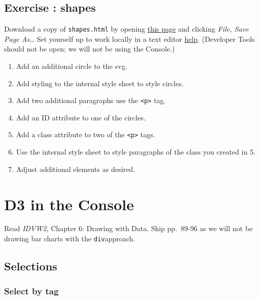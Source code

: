 \documentclass[openany]{book}
\begin{document}
\hypertarget{exercise-shapes}{%
\section{Exercise : shapes}\label{exercise-shapes}}

Download a copy of \texttt{shapes.html} by opening \href{https://raw.githubusercontent.com/jtr13/d3book/master/code/shapes.html}{this page} and clicking \emph{File, Save Page As\ldots{}} Set yourself up to work locally in a text editor \href{index.html\#text-editor}{help}. (Developer Tools should not be open; we will not be using the Console.)

\begin{enumerate}
\def\labelenumi{\arabic{enumi}.}
\item
  Add an additional circle to the svg.
\item
  Add styling to the internal style sheet to style circles.
\item
  Add two additional paragraphs use the \texttt{\textless{}p\textgreater{}} tag.
\item
  Add an ID attribute to one of the circles.
\item
  Add a class attribute to two of the \texttt{\textless{}p\textgreater{}} tags.
\item
  Use the internal style sheet to style paragraphs of the class you created in 5.
\item
  Adjust additional elements as desired.
\end{enumerate}

\protect\hyperlink{web-tech-shapes}{}

\hypertarget{d3console}{%
\chapter{D3 in the Console }\label{d3console}}

Read \emph{IDVW2}, Chapter 6: Drawing with Data. Skip pp.~89-96 as we will not be drawing bar charts with the \texttt{div}approach.

\hypertarget{selections}{%
\section{Selections }\label{selections}}

\hypertarget{select-by-tag}{%
\subsection{Select by tag}\label{select-by-tag}}
\end{document}
